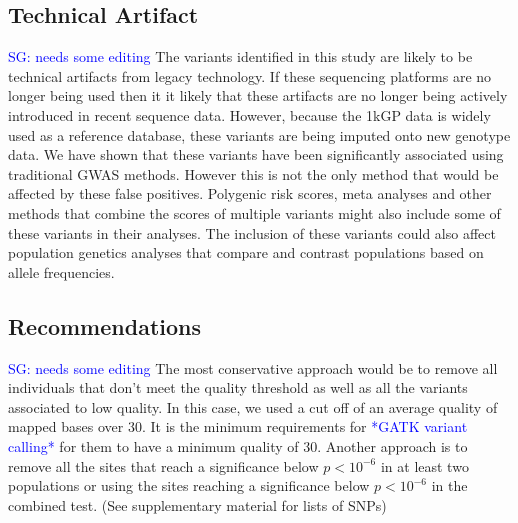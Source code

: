 \documentclass[9pt,lineno]{elife}
\newcommand{\sgcomment}[1]{\textcolor{blue}{SG: #1}}
\newcommand{\todo}[1]{\textcolor{blue}{*#1*}}
\begin{document}
\subsection{Technical Artifact}
\sgcomment{needs some editing}
The variants identified in this study are likely to be technical artifacts from legacy technology.
If these sequencing platforms are no longer being used then it it likely that these artifacts are no longer being actively introduced in recent sequence data.
However, because the 1kGP data is widely used as a reference database, these variants are being imputed onto new genotype data.
We have shown that these variants have been significantly associated using traditional GWAS methods.
However this is not the only method that would be affected by these false positives. 
Polygenic risk scores, meta analyses and other methods that combine the scores of multiple variants might also include some of these variants in their analyses.
The inclusion of these variants could also affect population genetics analyses that compare and contrast populations based on allele frequencies.

\subsection{Recommendations}
\sgcomment{needs some editing}
The most conservative approach would be to remove all individuals that don't meet the quality threshold as well as all the variants associated to low quality.
In this case, we used a cut off of an average quality of mapped bases over 30. 
It is the minimum requirements for \todo{GATK variant calling} for them to have a minimum quality of 30.
Another approach is to remove all the sites that reach a significance below $ p < 10^{-6}$ in at least two populations or using the sites reaching a significance below $ p < 10^{-6}$ in the combined test. (See supplementary material for lists of SNPs)

\end{document}
